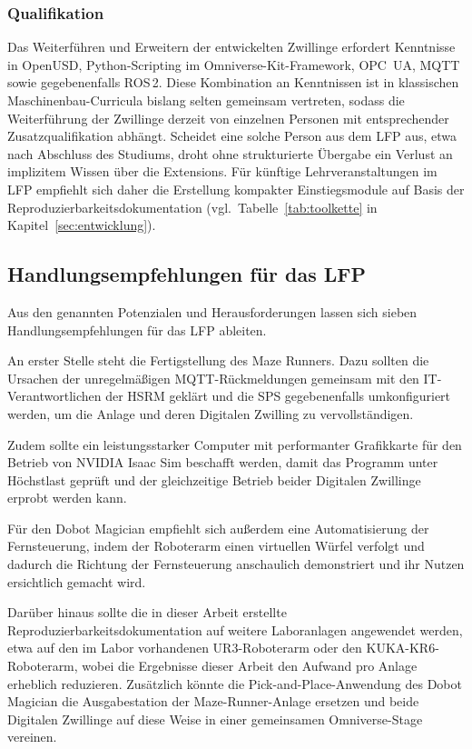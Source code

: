 \subsubsection{Qualifikation}
Das Weiterführen und Erweitern der entwickelten Zwillinge erfordert Kenntnisse in OpenUSD, Python-Scripting im Omniverse-Kit-Framework, OPC~UA, MQTT sowie gegebenenfalls ROS\,2. Diese Kombination an Kenntnissen ist in klassischen Maschinenbau-Curricula bislang selten gemeinsam vertreten, sodass die Weiterführung der Zwillinge derzeit von einzelnen Personen mit entsprechender Zusatzqualifikation abhängt. Scheidet eine solche Person aus dem LFP aus, etwa nach Abschluss des Studiums, droht ohne strukturierte Übergabe ein Verlust an implizitem Wissen über die Extensions. Für künftige Lehrveranstaltungen im LFP empfiehlt sich daher die Erstellung kompakter Einstiegsmodule auf Basis der Reproduzierbarkeitsdokumentation (vgl.\ Tabelle~\ref{tab:toolkette} in Kapitel~\ref{sec:entwicklung}).

\subsection{Handlungsempfehlungen für das LFP}

Aus den genannten Potenzialen und Herausforderungen lassen sich sieben Handlungsempfehlungen für das LFP ableiten.

An erster Stelle steht die Fertigstellung des Maze Runners. Dazu sollten die Ursachen der unregelmäßigen MQTT-Rückmeldungen gemeinsam mit den IT-Verantwortlichen der HSRM geklärt und die SPS gegebenenfalls umkonfiguriert werden, um die Anlage und deren Digitalen Zwilling zu vervollständigen.

Zudem sollte ein leistungsstarker Computer mit performanter Grafikkarte für den Betrieb von NVIDIA Isaac Sim beschafft werden, damit das Programm unter Höchstlast geprüft und der gleichzeitige Betrieb beider Digitalen Zwillinge erprobt werden kann.

Für den Dobot Magician empfiehlt sich außerdem eine Automatisierung der Fernsteuerung, indem der Roboterarm einen virtuellen Würfel verfolgt und dadurch die Richtung der Fernsteuerung anschaulich demonstriert und ihr Nutzen ersichtlich gemacht wird.

Darüber hinaus sollte die in dieser Arbeit erstellte Reproduzierbarkeitsdokumentation auf weitere Laboranlagen angewendet werden, etwa auf den im Labor vorhandenen UR3-Roboterarm oder den KUKA-KR6-Roboterarm, wobei die Ergebnisse dieser Arbeit den Aufwand pro Anlage erheblich reduzieren. Zusätzlich könnte die Pick-and-Place-Anwendung des Dobot Magician die Ausgabestation der Maze-Runner-Anlage ersetzen und beide Digitalen Zwillinge auf diese Weise in einer gemeinsamen Omniverse-Stage vereinen.

